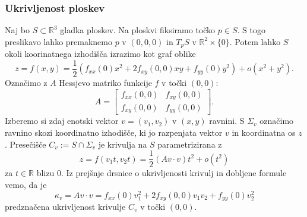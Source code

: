\documentclass[8pt]{beamer}
\theoremstyle{definition}
\theoremstyle{remark}
\theoremstyle{plain}
\numberwithin{equation}{section}  %
\begin{document}
\begin{frame}
    \frametitle{Ukrivljenost ploskev}

    Naj bo $S \subset \mathbb{R}^3$ gladka ploskev. Na ploskvi fiksiramo točko $p \in S$. S togo preslikavo lahko premaknemo $p$ v $(0,0,0)$ in $T_p S$ v $\mathbb{R}^2 \times\{0\}$. Potem lahko $S$ okoli koorinatnega izhodišča izrazimo kot graf oblike 
    \begin{equation*}
        z=f(x, y)=\frac{1}{2}\left(f_{x x}(0) x^2+2 f_{x y}(0,0) x y+f_{y y}(0) y^2\right)+o\left(x^2+y^2\right). 
    \end{equation*}
    Označimo z $A$ Hessjevo matriko funkcije $f$ v točki $(0,0)$:
    \begin{equation*}
        A=\begin{bmatrix}
            f_{x x}(0,0) & f_{x y}(0,0) \\
            f_{x y}(0,0) & f_{y y}(0,0)
        \end{bmatrix} .
    \end{equation*}
    Izberemo si zdaj enotski vektor $v=\left(v_1, v_2\right)$ v $(x,y)$ ravnini. S $\Sigma_v$ označimo ravnino skozi koordinatno izhodišče, ki jo razpenjata vektor $v$ in koordinatna os $z$. Presečišče $C_v:=S \cap \Sigma_v$ je krivulja na $S$ parametrizirana z
    \begin{equation*}
        z=f\left(v_1 t, v_2 t\right)=\frac{1}{2}(A v \cdot v) t^2+o\left(t^2\right)
    \end{equation*}
    za $t \in \mathbb{R}$ blizu $0$. Iz prejšnje drsnice o ukrivljenosti krivulj in dobljene formule vemo, da je 
    \begin{equation*}
        \kappa_v=A v \cdot v=f_{x x}(0) v_1^2+2 f_{x y}(0,0) v_1 v_2+f_{y y}(0) v_2^2
    \end{equation*}
    predznačena ukrivljenost krivulje $C_v$ v točki $(0,0)$.
    
\end{frame}
\end{document}
